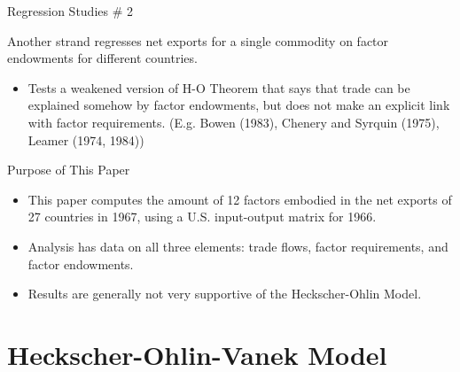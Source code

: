 \documentclass[aspectratio=169]{beamer}
\begin{document}

\begin{frame}{Regression Studies \# 2}

Another strand regresses net exports for a single commodity on factor endowments for different countries.

\begin{itemize}
    \item<1-> Tests a weakened version of H-O Theorem that says that trade can be explained somehow by factor endowments, but does not make an explicit link with factor requirements. (E.g. Bowen (1983), Chenery and Syrquin (1975), Leamer (1974, 1984))
\end{itemize}
    
\end{frame}


\begin{frame}{Purpose of This Paper}

\begin{itemize}
    \item<1-> This paper computes the amount of 12 factors embodied in the net exports of 27 countries in 1967, using a U.S. input-output matrix for 1966.
    \item<2-> Analysis has data on all three elements:  trade flows, factor requirements, and factor endowments.
    \item<3-> Results are generally not very supportive of the Heckscher-Ohlin Model.
\end{itemize}
    
\end{frame}


\section{Heckscher-Ohlin-Vanek Model}

\end{document}
